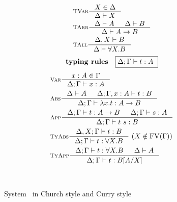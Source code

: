 \begin{figure}
\begin{singlespace}
\begin{minipage}{.46\textwidth}
\begin{align*}
& \inference[\sc TVar]{X \in \Delta}{\Delta |- X} \\
& \inference[\sc TArr]{\Delta |- A & \Delta |- B}{\Delta |- A -> B} \\
& \inference[\sc TAll]{\Delta,X |- B}{\Delta |- \forall X.B} \\
\end{align*}
\[ \textbf{typing rules} \quad \framebox{$ \Delta;\Gamma |- t : A $ } \]
\vspace*{-1em}
\begin{align*}
& \inference[\sc Var]{x:A \in \Gamma}{\Delta;\Gamma |- x:A} \\
& \inference[\sc Abs]{\Delta |- A & \Delta;\Gamma,x:A |- t : B}
		     {\Delta;\Gamma |- \l x   .t : A -> B} \\
& \inference[\sc App]{\Delta;\Gamma |- t : A -> B & \Delta;\Gamma |- s : A}
		     {\Delta;\Gamma |- t~s : B} \\
& \inference[\sc TyAbs]{\Delta,X;\Gamma |- t : B}
		       {\Delta;\Gamma |- t : \forall X.B} ~
		       (X\notin\FV(\Gamma)) \\
& \inference[\sc TyApp]{\Delta;\Gamma |- t : \forall X.B & \Delta |- A}
		       {\Delta;\Gamma |- t : B[A/X]}
\end{align*}
\end{minipage}
~\\
\caption{System \F\ in Church style and Curry style}
\label{fig:f}
\end{singlespace}
\end{figure}

